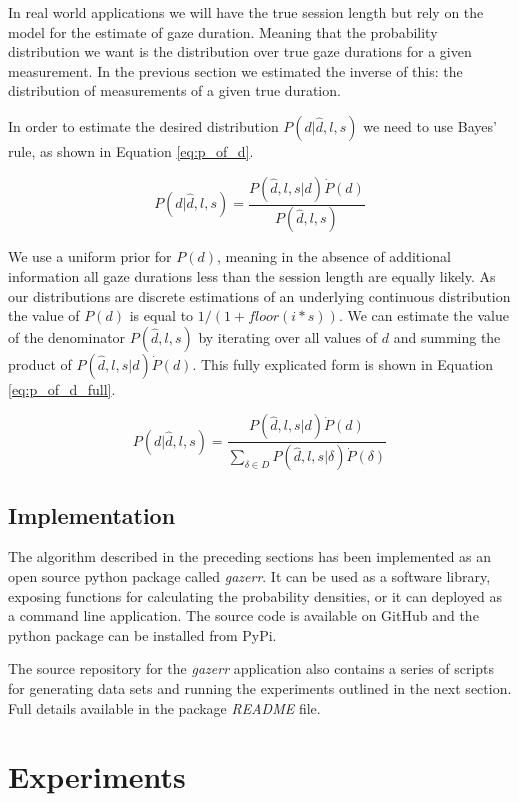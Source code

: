 \documentclass[12pt,a4paper]{article}
\numberwithin{equation}{section}
\begin{document}
In real world applications we will have the true session length but rely on the model for the 
estimate of gaze duration. Meaning that the probability distribution we want is the distribution 
over true gaze durations for a given measurement. In the previous section we estimated the inverse of
this: the distribution of measurements of a given true duration. 

In order to estimate the desired distribution $P(d|\hat{d},l,s)$ we need to use 
Bayes' rule, as shown in Equation \ref{eq:p_of_d}.

\begin{equation}
\label{eq:p_of_d}
P(d|\hat{d},l,s) =  \frac{ P(\hat{d},l,s|d) \dot P(d) }{ P(\hat{d},l,s)  }
\end{equation}

We use a uniform prior for $P(d)$, meaning in the absence of additional information all
gaze durations less than the session length are equally likely. As our distributions are
discrete estimations of an underlying continuous distribution the value of $P(d)$ is
equal to $1/(1+floor(i*s))$. We can estimate the value
of the denominator $P(\hat{d},l,s)$ by iterating over all values of $d$ and summing the product
of $ P(\hat{d},l,s|d) \dot P(d)$. This fully explicated form is shown in 
Equation \ref{eq:p_of_d_full}.

\begin{equation}
\label{eq:p_of_d_full}
P(d|\hat{d},l,s) =  \frac{ P(\hat{d},l,s|d) \dot P(d) }{ \sum_{\delta \in D} P(\hat{d},l,s|\delta) \dot P(\delta)  }
\end{equation}

\subsection{Implementation}

The algorithm described in the preceding sections has been implemented as an open source python 
package called \textit{gazerr}. 
It can be used as a software library, exposing functions for calculating the probability densities,
or it can deployed as a command line application. 
The source code is available on GitHub and the python package can be installed from PyPi.

The source repository for the \textit{gazerr} application also contains a series of 
scripts for generating data sets and running the experiments outlined in the next 
section. Full details available in the package \textit{README} file.

\section{Experiments}
\end{document}
